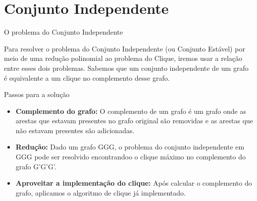 \documentclass[compress,aspectratio=169]{beamer}
\begin{document}
\section{Conjunto Independente}
    \begin{frame}{O problema do Conjunto Independente}
    \begin{justify}
        Para resolver o problema do Conjunto Independente (ou Conjunto Estável) por meio de uma redução polinomial ao problema do Clique, iremos usar a relação entre esses dois problemas. Sabemos que um conjunto independente de um grafo é equivalente a um clique no complemento desse grafo.
    \end{justify}
    \end{frame}

    \begin{frame}{Passos para a solução}
        \begin{itemize}
            \item \textbf{Complemento do grafo:} O complemento de um grafo é um grafo onde as arestas que estavam presentes no grafo original são removidas e as arestas que não estavam presentes são adicionadas.
            \item \textbf{Redução:} Dado um grafo GGG, o problema do conjunto independente em GGG pode ser resolvido encontrandoo o clique máximo no complemento do grafo G'G'G'.
            \item \textbf{Aproveitar a implementação do clique:} Após calcular o complemento do grafo, aplicamos o algoritmo de clique já implementado.\\
        \end{itemize}
    \end{frame}
\end{document}
